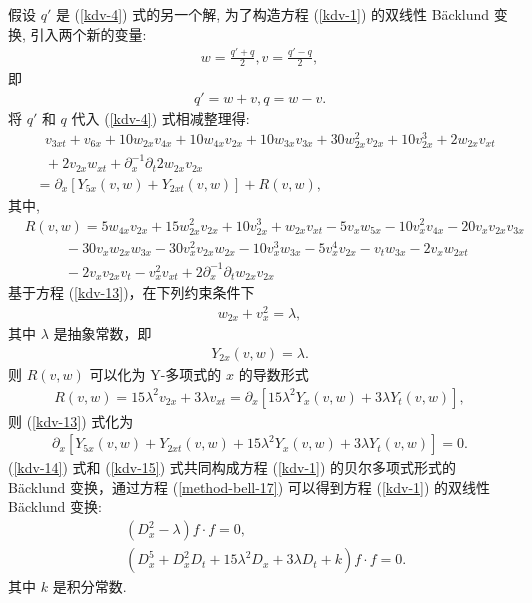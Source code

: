 假设 $q'$ 是 (\ref{kdv-4}) 式的另一个解, 为了构造方程 (\ref{kdv-1}) 的双线性 B\"{a}cklund 变换, 引入两个新的变量:
\begin{align}
w=\frac{q'+q}{2}, v=\frac{q'-q}{2},\nonumber
\end{align}
即
\begin{align}
q'=w+v, q=w-v.\nonumber
\end{align}
将 $q'$ 和 $q$ 代入 (\ref{kdv-4}) 式相减整理得:
\begin{align}
&~~~v_{3xt}+v_{6x}+10w_{2x}v_{4x}+10w_{4x}v_{2x}+10w_{3x}v_{3x}+30w_{2x}^2v_{2x}+10v_{2x}^3+2w_{2x}v_{xt}\nonumber\\
&~~~+2v_{2x}w_{xt}+\partial_x^{-1}\partial_t2w_{2x}v_{2x}\nonumber\\
&=\partial_x[Y_{5x}(v,w)+Y_{2xt}(v,w)]+R(v,w),\label{kdv-13}
\end{align}
其中,
\begin{align}
&R(v,w)=5w_{4x}v_{2x}+15w_{2x}^2v_{2x}+10v_{2x}^3+w_{2x}v_{xt}-5v_{x}w_{5x}-10v_x^2v_{4x}-20v_xv_{2x}v_{3x}\nonumber\\
&~~~~~~~~~~~~~-30v_xw_{2x}w_{3x}-30v_x^2v_{2x}w_{2x}-10v_x^3w_{3x}-5v_x^4v_{2x}-v_tw_{3x}-2v_xw_{2xt}\nonumber\\
&~~~~~~~~~~~~~-2v_xv_{2x}v_t-v_x^2v_{xt}+2\partial_x^{-1}\partial_tw_{2x}v_{2x}\nonumber
\end{align}
基于方程 (\ref{kdv-13})，在下列约束条件下
\begin{align}
w_{2x}+v_x^2=\lambda,\nonumber
\end{align}
其中 $\lambda$ 是抽象常数，即
\begin{align}
Y_{2x}(v,w)=\lambda.\label{kdv-14}
\end{align}
则 $R(v,w)$ 可以化为 Y-多项式的 $x$ 的导数形式
\begin{align}
R(v,w)=15\lambda^2v_{2x}+3\lambda v_{xt}=\partial_x[15\lambda^2Y_x(v,w)+3\lambda Y_t(v,w)],\nonumber
\end{align}
则 (\ref{kdv-13}) 式化为
\begin{align}
\partial_x[Y_{5x}(v,w)+Y_{2xt}(v,w)+15\lambda^2Y_x(v,w)+3\lambda Y_t(v,w)]=0.\label{kdv-15}
\end{align}
(\ref{kdv-14}) 式和 (\ref{kdv-15}) 式共同构成方程 (\ref{kdv-1}) 的贝尔多项式形式的 B\"{a}cklund 变换，通过方程 (\ref{method-bell-17}) 可以得到方程 (\ref{kdv-1}) 的双线性 B\"{a}cklund 变换:
\begin{align}
&(D_x^2-\lambda)f\cdot f=0,\label{kdv-21}\\
&(D_x^5+D_x^2D_t+15\lambda^2D_x+3\lambda D_t+k)f\cdot f=0.\label{kdv-22}
\end{align}
其中 $k$ 是积分常数.
